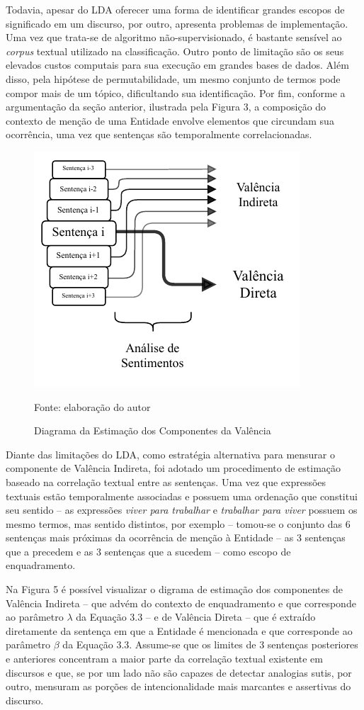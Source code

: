 \documentclass[
12pt,				%
openright,			%
twoside,			%
a4paper,			%
english,			%
french,				%
spanish,			%
brazil				%
]{abntex2}
\begin{document}
Todavia, apesar do LDA oferecer uma forma de identificar grandes escopos de significado em um discurso, por outro, apresenta problemas de implementação. Uma vez que trata-se de algoritmo não-supervisionado, é bastante sensível ao \emph{corpus} textual utilizado na classificação. Outro ponto de limitação são os seus elevados custos computais para sua execução em grandes bases de dados. Além disso, pela hipótese de permutabilidade, um mesmo conjunto de termos pode compor mais de um tópico, dificultando sua identificação. Por fim, conforme a argumentação da seção anterior, ilustrada pela Figura 3, a composição do contexto de menção de uma Entidade envolve elementos que circundam sua ocorrência, uma vez que sentenças são temporalmente correlacionadas. 
 
\begin{figure}[h]
	\caption{Diagrama da Estimação dos Componentes da Valência}
	\label{fig:diagram_op}
	\centering
	\includegraphics[width=0.5\linewidth]{figures/estimacao_valencia}
	
	Fonte: elaboração do autor
\end{figure}
 
Diante das limitações do LDA, como estratégia alternativa para mensurar o componente de Valência Indireta, foi adotado um procedimento de estimação baseado na correlação textual entre as sentenças. Uma vez que expressões textuais estão temporalmente associadas e possuem uma ordenação que constitui seu sentido -- as expressões \textit{viver para trabalhar} e \textit{trabalhar para viver} possuem os mesmo termos, mas sentido distintos, por exemplo -- tomou-se o conjunto das 6 sentenças mais próximas da ocorrência de menção à Entidade -- as 3 sentenças que a precedem e as 3 sentenças que a sucedem -- como escopo de enquadramento. 

Na Figura 5 é possível visualizar o digrama de estimação dos componentes de Valência Indireta -- que advém do contexto de enquadramento e que corresponde ao parâmetro $\lambda$ da Equação 3.3 -- e de Valência Direta -- que é extraído diretamente da sentença em que a Entidade é mencionada e que corresponde ao parâmetro $\beta$ da Equação 3.3. Assume-se que os limites de 3 sentenças posteriores e anteriores concentram a maior parte da correlação textual existente em discursos e que, se por um lado não são capazes de detectar analogias sutis, por outro, mensuram as porções de intencionalidade mais marcantes e assertivas do discurso.
 
\end{document}
